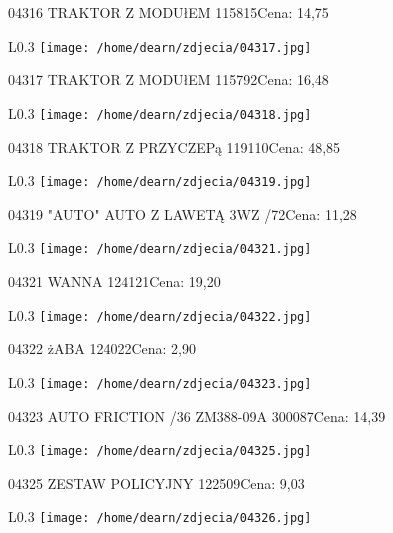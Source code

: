 04316 TRAKTOR Z MODUłEM                              115815Cena: 14,75\newline
\begin{wrapfigure}{L}{0.3\textwidth}
\texttt{[image: /home/dearn/zdjecia/04317.jpg]}
\end{wrapfigure}
04317 TRAKTOR Z MODUłEM                              115792Cena: 16,48\newline
\begin{wrapfigure}{L}{0.3\textwidth}
\texttt{[image: /home/dearn/zdjecia/04318.jpg]}
\end{wrapfigure}
04318 TRAKTOR Z PRZYCZEPą                             119110Cena: 48,85\newline
\begin{wrapfigure}{L}{0.3\textwidth}
\texttt{[image: /home/dearn/zdjecia/04319.jpg]}
\end{wrapfigure}
04319 "AUTO" AUTO Z LAWETĄ 3WZ /72Cena: 11,28\newline
\begin{wrapfigure}{L}{0.3\textwidth}
\texttt{[image: /home/dearn/zdjecia/04321.jpg]}
\end{wrapfigure}
04321 WANNA                                           124121Cena: 19,20\newline
\begin{wrapfigure}{L}{0.3\textwidth}
\texttt{[image: /home/dearn/zdjecia/04322.jpg]}
\end{wrapfigure}
04322 żABA                                            124022Cena: 2,90\newline
\begin{wrapfigure}{L}{0.3\textwidth}
\texttt{[image: /home/dearn/zdjecia/04323.jpg]}
\end{wrapfigure}
04323 AUTO FRICTION /36 ZM388-09A 300087Cena: 14,39\newline
\begin{wrapfigure}{L}{0.3\textwidth}
\texttt{[image: /home/dearn/zdjecia/04325.jpg]}
\end{wrapfigure}
04325 ZESTAW POLICYJNY                                122509Cena: 9,03\newline
\begin{wrapfigure}{L}{0.3\textwidth}
\texttt{[image: /home/dearn/zdjecia/04326.jpg]}
\end{wrapfigure}
